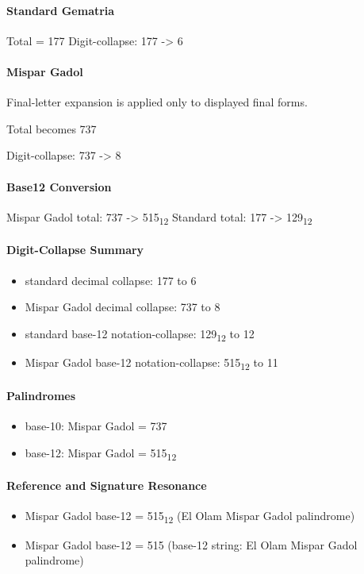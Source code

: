 \paragraph{Standard Gematria}
Total = 177
Digit-collapse: 177 -> 6
\paragraph{Mispar Gadol}
Final-letter expansion is applied only to displayed final forms.

Total becomes 737

Digit-collapse: 737 -> 8
\paragraph{Base12 Conversion}
Mispar Gadol total: 737 -> 515\textsubscript{12}
Standard total: 177 -> 129\textsubscript{12}
\paragraph{Digit-Collapse Summary}
\begin{itemize}
\item standard decimal collapse: 177 to 6
\item Mispar Gadol decimal collapse: 737 to 8
\item standard base-12 notation-collapse: 129\textsubscript{12} to 12
\item Mispar Gadol base-12 notation-collapse: 515\textsubscript{12} to 11
\end{itemize}
\paragraph{Palindromes}
\begin{itemize}
\item base-10: Mispar Gadol = 737
\item base-12: Mispar Gadol = 515\textsubscript{12}
\end{itemize}
\paragraph{Reference and Signature Resonance}
\begin{itemize}
\item Mispar Gadol base-12 = 515\textsubscript{12} (El Olam Mispar Gadol palindrome)
\item Mispar Gadol base-12 = 515 (base-12 string: El Olam Mispar Gadol palindrome)
\end{itemize}
